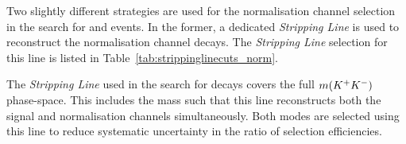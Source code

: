 

Two slightly different strategies are used for the normalisation channel selection in the search for \decay{\Bp}{\Dsp\phiz} and \decay{\Bp}{\Dsp\Kp\Km} events.
In the former, a dedicated \decay{\Bp}{\Dsp\Dzb} \emph{Stripping Line} is used to reconstruct the normalisation channel decays.
The \emph{Stripping Line} selection for this line is listed in Table~\ref{tab:strippinglinecuts_norm}.


The \emph{Stripping Line} used in the search for \decay{\Bp}{\Dsp\Kp\Km} decays covers the full $m({{K}^+}{{K}^-})$ phase-space. This includes the \Dzb mass such that this line reconstructs both the signal and normalisation channels simultaneously. 
Both modes are selected using this line to reduce systematic uncertainty in the ratio of selection efficiencies.

